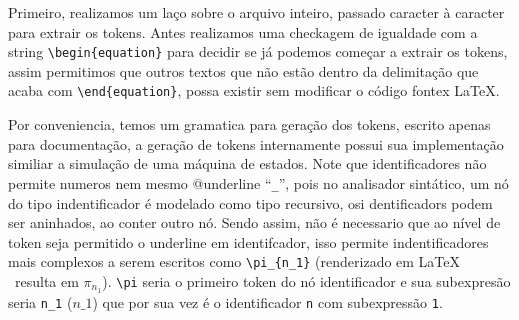 
Primeiro, realizamos um laço sobre o arquivo inteiro, passado caracter à caracter para extrair os tokens. Antes realizamos uma checkagem de igualdade com a string
\verb|\begin{equation}| para decidir se já podemos começar a extrair os tokens, assim permitimos que outros textos que não estão dentro da delimitação que acaba com \verb|\end{equation}|, possa existir sem modificar o código fontex \LaTeX{}.

Por conveniencia, temos um gramatica para geração dos tokens, escrito apenas para documentação, a geração de tokens internamente possui sua implementação similiar a simulação de uma máquina de estados.
Note que identificadores não permite numeros nem mesmo @underline ``\verb|_|'', pois  no analisador sintático, um nó do tipo indentificador é modelado como tipo recursivo, osi dentificadors podem ser aninhados, ao  conter outro nó. Sendo assim, não é necessario que ao nível de token seja permitido o underline em identifcador, isso permite indentificadores mais complexos a serem escritos como \verb|\pi_{n_1}| (renderizado em \LaTeX{} \ resulta em $\pi_{n_1}$). \verb"\pi"  seria o primeiro token do nó identificador e sua subexpresão seria \verb"n_1" ($n\_1$) que por sua vez é o identificador \verb"n" com subexpressão \verb"1".

